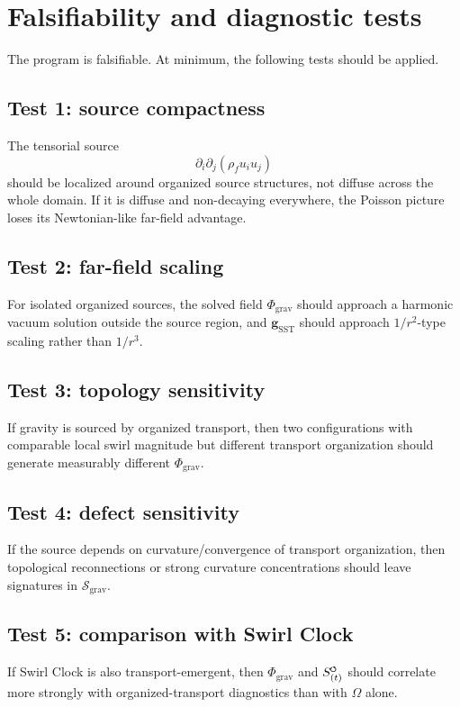 \documentclass[11pt]{article}
\newcommand{\swirlarrow}{\mathchoice{\mkern-2mu\scriptstyle\boldsymbol{\circlearrowleft}}{\mkern-2mu\scriptstyle\boldsymbol{\circlearrowleft}}{\mkern-2mu\scriptscriptstyle\boldsymbol{\circlearrowleft}}{\mkern-2mu\scriptscriptstyle\boldsymbol{\circlearrowleft}}}
\newcommand{\rhoF}{\rho_{\!f}}
\newcommand{\SwirlClock}{{S_{(t)}^{\swirlarrow}}}
\newcommand{\SST}{\mathrm{SST}}
\newcommand{\grav}{\mathrm{grav}}
\begin{document}
        \section{Falsifiability and diagnostic tests}
        
        The program is falsifiable. At minimum, the following tests should be applied.
        
        \subsection{Test 1: source compactness}
            The tensorial source
            \[
                \partial_i\partial_j(\rhoF u_i u_j)
            \]
            should be localized around organized source structures, not diffuse across the whole domain. If it is diffuse and non-decaying everywhere, the Poisson picture loses its Newtonian-like far-field advantage.
        
        \subsection{Test 2: far-field scaling}
            For isolated organized sources, the solved field \(\Phi_{\grav}\) should approach a harmonic vacuum solution outside the source region, and \(\mathbf{g}_{\SST}\) should approach \(1/r^2\)-type scaling rather than \(1/r^3\).
        
        \subsection{Test 3: topology sensitivity}
            If gravity is sourced by organized transport, then two configurations with comparable local swirl magnitude but different transport organization should generate measurably different \(\Phi_{\grav}\).
        
        \subsection{Test 4: defect sensitivity}
            If the source depends on curvature/convergence of transport organization, then topological reconnections or strong curvature concentrations should leave signatures in \(\mathcal{S}_{\grav}\).
        
        \subsection{Test 5: comparison with Swirl Clock}
            If Swirl Clock is also transport-emergent, then \(\Phi_{\grav}\) and \(\SwirlClock\) should correlate more strongly with organized-transport diagnostics than with \(\Omega\) alone.
        
\end{document}
